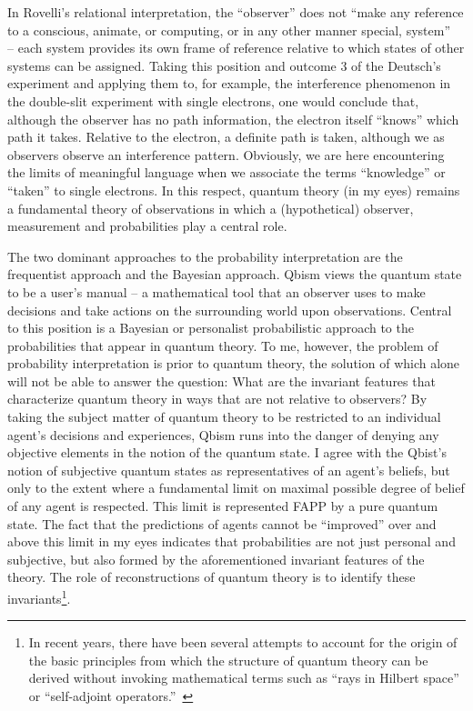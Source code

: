 \documentclass[12pt,a4]{article}
\begin{document}
In Rovelli's relational interpretation, the ``observer'' does not ``make any reference to a conscious, animate, or computing, or in any other manner special, system''~\cite{rovelli} -- each system provides its own frame of reference relative to which states of other systems can be assigned. Taking this position and outcome 3 of the Deutsch's experiment and applying them to, for example, the interference phenomenon in the double-slit experiment with single electrons, one would conclude that, although the observer has no path information, the electron itself ``knows'' which path it takes. Relative to the electron, a definite path is taken, although we as observers observe an interference pattern. Obviously, we are here encountering the limits of meaningful language when we associate the terms ``knowledge'' or ``taken'' to single electrons. In this respect, quantum theory (in my eyes) remains a fundamental theory of observations in which a (hypothetical) observer, measurement and probabilities play a central role.

The two dominant approaches to the probability interpretation are the frequentist approach and the Bayesian approach. Qbism 
views the quantum state to be a user's manual --  a mathematical tool that an observer uses to make decisions and take actions on the surrounding world upon observations. Central to this position is a Bayesian or personalist probabilistic approach to the probabilities that appear in quantum theory. To me, however, the problem of probability interpretation is prior to quantum theory, the solution of which alone will not be able to answer the question: What are the invariant features that characterize quantum theory in ways that are not relative to observers? By taking the subject matter of quantum theory to be restricted to an individual agent's decisions and experiences, Qbism runs into the danger of denying any objective elements in the notion of the quantum state. I agree with the Qbist's notion of subjective quantum states as representatives of an agent's beliefs, but only to the extent where a fundamental limit on maximal possible degree of belief of any agent is respected. This limit is represented FAPP by a pure quantum state. The fact that the predictions of agents cannot be ``improved'' over and above this limit in my eyes indicates that probabilities are not just personal and subjective, but also formed by the aforementioned invariant features of the theory. The role of reconstructions of quantum theory is to identify these invariants\footnote{In recent years, there have been several attempts to account for the origin of the basic principles from which the structure of quantum theory can be derived without invoking mathematical terms such as ``rays in Hilbert space'' or ``self-adjoint operators.''~\cite{hardy,dakicbrukner,masanesmueller,chiribella}}.
\end{document}
